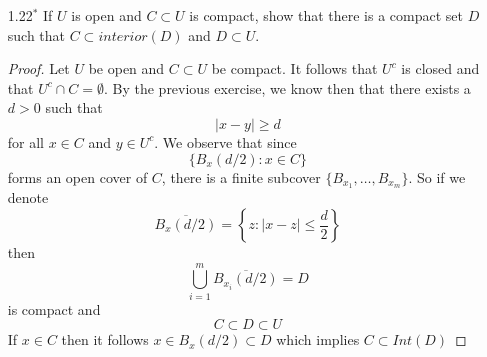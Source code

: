 \begin{enumerate}
\begin{proof}
\begin{enumerate}
        \item Let \( A \) be closed and \( B \) be compact with \( A \cap B = \emptyset \). Since \( A \) is closed and \( A \) and \( B \) are disjoint, by (a), we know that for every \( x \in B \) there exists \( d_x > 0 \) such that for all \( y \in A \) we have \( \left| y-x \right| \geq d_x \). So
        \[
        \left\{ B_x\left( \frac{d_x}{2} \right): x \in B \right\}
        \]
        forms an open cover of \( B \). By compactness of \( B \), there exists a finite subcover
        \[
        \left\{ B_{x_1}\left( \frac{d_{x_1}}{2} \right), \ldots,B_{x_m}\left( \frac{d_{x_m}}{2} \right) \right\}
        \]
        So for all \( y \in A \) and \( 1 \leq i \leq m \)
        \[
        \left| y - x_i \right| \leq \left| y - x \right| + \left| x - x_i \right|
        \]
        Thus, if \( x \in B \) then \( x \in B_{x_i}\left( \frac{d_{x_i}}{2} \right) \) for some \( i \), and the above inequality implies 
        \[
        \min_{1 \leq i \leq m} \frac{d_{x_i}}{2} \leq \frac{d_{x_i}}{2} = d_{x_i} - \frac{d_{x_i}}{2} \leq \left| y-x_i \right| - \left| x - x_i  \right| \leq \left| y - x \right| 
        \]
        \item If
        \begin{align*}
            A &= \left\{ (0, n): n \in \mathbb{N} \right\} \\
            \intertext{and}
            B &= \left\{ (0, n-\frac{1}{n}): n \in \mathbb{N} \right\}
        \end{align*}
        then it is clear that both \( A \) and \( B \) are closed, but not bounded and therefore not compact. Furthermore, \( A \cap B = \emptyset \) and for all \( n \in \mathbb{N} \) we can find \( y \in A \) and an \( x \in B \) such that
        \[
        \left| y-x \right| < \frac{1}{n}
        \]
    \end{enumerate}
    \end{proof}
    
    \item[1.22\( ^* \)] If \( U \) is open and \( C \subset U \) is compact, show that there is a compact set \( D \) such that \( C \subset interior(D) \) and \( D \subset U \).
    
    \begin{proof}
    Let \( U \) be open and \( C \subset U \) be compact. It follows that \( U^c \) is closed and that \( U^c \cap C = \emptyset \). By the previous exercise, we know then that there exists a \( d > 0 \) such that
    \[
    \left| x-y \right| \geq d
    \]
    for all \( x \in C \) and \( y \in U^c \). We observe that since
    \[
    \{ B_x(d/2): x \in C \}
    \]
    forms an open cover of \( C \), there is a finite subcover \( \{ B_{x_1}, \ldots, B_{x_m} \} \). So if we denote
    \[
    \overline{B_x(d/2)} = \left\{ z: \left| x-z \right| \leq \frac{d}{2} \right\}
    \]
    then 
    \[
    \bigcup_{i=1}^m \overline{B_{x_i}(d/2)} = D
    \]
    is compact and
    \[
    C \subset D \subset U
    \]
    If \( x \in C \) then it follows \( x \in B_x(d/2) \subset D \) which implies \( C \subset Int(D) \)
    \end{proof}
    

\end{enumerate}
